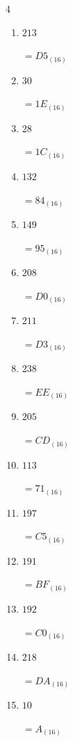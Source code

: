 \newpage
\resetdrill

\begin{multicols}{4}
\begin{enumerate}
  \itemsep=10pt
  \item $213$

        $=D5_{(16)}$

  \item $30$

        $=1E_{(16)}$

  \item $28$

        $=1C_{(16)}$

  \item $132$

        $=84_{(16)}$

  \item $149$

        $=95_{(16)}$

  \item $208$

        $=D0_{(16)}$

  \item $211$

        $=D3_{(16)}$

  \item $238$

        $=EE_{(16)}$

  \item $205$

        $=CD_{(16)}$

  \item $113$

        $=71_{(16)}$

  \item $197$

        $=C5_{(16)}$

  \item $191$

        $=BF_{(16)}$

  \item $192$

        $=C0_{(16)}$

  \item $218$

        $=DA_{(16)}$

  \item $10$

        $=A_{(16)}$

\columnbreak %


\end{enumerate}
\end{multicols}
